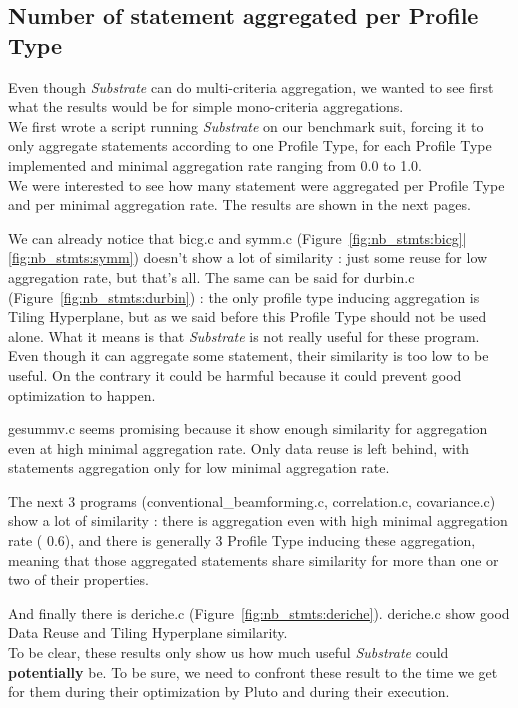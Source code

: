 \documentclass[paper=a4, fontsize=11.5pt]{scrartcl}
\numberwithin{equation}{section}        %
\numberwithin{figure}{section}          %
\numberwithin{table}{section}               %
\begin{document}
\subsection{Number of statement aggregated per Profile Type}
\label{sec:nb_stmt}

Even though \textit{Substrate} can do multi-criteria aggregation, we wanted to see first what
the results would be for simple mono-criteria aggregations.\\
We first wrote a script running \textit{Substrate} on our benchmark suit, forcing it to
only aggregate statements according to one Profile Type, for each Profile Type implemented
and minimal aggregation rate ranging from 0.0 to 1.0.\\

We were interested to see how many statement were aggregated per Profile Type and per minimal
aggregation rate. The results are shown in the next pages.

We can already notice that bicg.c and symm.c (Figure~\ref{fig:nb_stmts:bicg}|\ref{fig:nb_stmts:symm})
doesn't show a lot of similarity : just some reuse for low aggregation rate, but that's all.
The same can be said for durbin.c (Figure~\ref{fig:nb_stmts:durbin}) : the only profile type
inducing aggregation is Tiling Hyperplane, but as we said before this Profile Type should not
be used alone.
What it means is that \textit{Substrate} is not really useful for these program. Even though
it can aggregate some statement, their similarity is too low to be useful. On the contrary
it could be harmful because it could prevent good optimization to happen.

gesummv.c seems promising because it show enough similarity for aggregation even at high
minimal aggregation rate. Only data reuse is left behind, with statements aggregation only
for low minimal aggregation rate.

The next 3 programs (conventional\_beamforming.c, correlation.c, covariance.c) show a lot of
similarity : there is aggregation even with high minimal aggregation rate ( 0.6), and
there is generally 3 Profile Type inducing these aggregation, meaning that those aggregated 
statements share similarity for more than one or two of their properties.

And finally there is deriche.c (Figure~\ref{fig:nb_stmts:deriche}). deriche.c show good
Data Reuse and Tiling Hyperplane similarity.\\

To be clear, these results only show us how much useful \textit{Substrate} could \textbf{potentially} be.
To be sure, we need to confront these result to the time we get for them during their optimization by Pluto
and during their execution.
\end{document}
